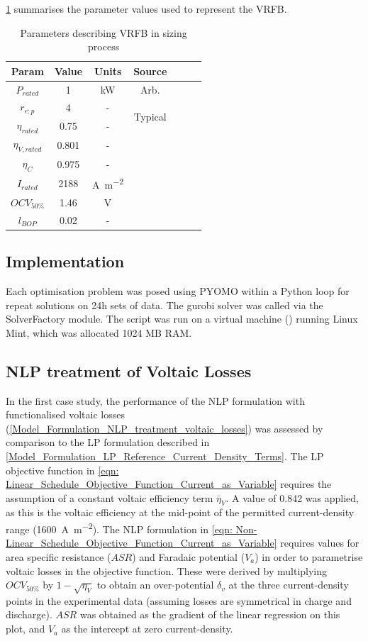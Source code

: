 \documentclass[preprint,3p,review,authoryear,10pt]{elsarticle}
\begin{document}
\cref{tab:VRFB_Sizing_Params} summarises the parameter values used to represent the VRFB.

\begin{table}[!pht]
\captionsetup{font=normalsize}
\centering
\caption{Parameters describing VRFB in sizing process}
\label{tab:VRFB_Sizing_Params}
\begin{tabular}{ccccccc}
\hline
Param &  Value & Units &  Source \\
\hline
$P_{rated}$ & 1 & \si{\kilo\watt} & Arb.\\
$r_{e:p}$ & 4 & - & \multirow{2}{*}{Typical}\\
$\eta_{rated}$ & 0.75 & - \\
\hline
$\eta_{V,rated}$ & 0.801 & - &\multirow{3}{*}{\cite{Reed2016}}\\
$\eta_C$ & 0.975 & -\\
$I_{rated}$ & 2188 & \si{\ampere\per\square\meter} \\
\hline
$OCV_{50\%}$ & 1.46 & \si{\volt} & \cite{Kim2011}\\
$l_{BOP}$ & 0.02 & - & \cite{Kim2013}\\

\hline
\end{tabular}
\end{table}

\subsection{Implementation}
\label{Results_Implementation}
Each optimisation problem was posed using PYOMO within a Python loop for repeat solutions on 24h sets of data. The gurobi solver was called via the SolverFactory module. The script was run on a virtual machine (\cite{VirtualBox}) running Linux Mint, which was allocated 1024 MB RAM.


\subsection{NLP treatment of Voltaic Losses}
\label{Results_NLP_Treatment_Voltaic_losses}
In the first case study, the performance of the NLP formulation with functionalised voltaic losses (\cref{Model_Formulation_NLP_treatment_voltaic_losses}) was assessed by comparison to the LP formulation described in \cref{Model_Formulation_LP_Reference_Current_Density_Terms}. The LP objective function in \cref{eqn: Linear_Schedule_Objective_Function_Current_as_Variable} requires the assumption of a constant voltaic efficiency term $\bar\eta_{V}$. A value of 0.842 was applied, as this is the voltaic efficiency at the mid-point of the permitted current-density range (\SI{1600}{\ampere\per\square\meter}). The NLP formulation in \cref{eqn: Non-Linear_Schedule_Objective_Function_Current_as_Variable} requires values for area specific resistance ($ASR$) and Faradaic potential ($V_a$) in order to parametrise voltaic losses in the objective function. These were derived by multiplying $OCV_{50\%}$ by $1-\sqrt{\eta_V}$ to obtain an over-potential $\delta_v$ at the three current-density points in the experimental data (assuming losses are symmetrical in charge and discharge). $ASR$ was obtained as the gradient of the linear regression on this plot, and $V_a$ as the intercept at zero current-density.
\end{document}
